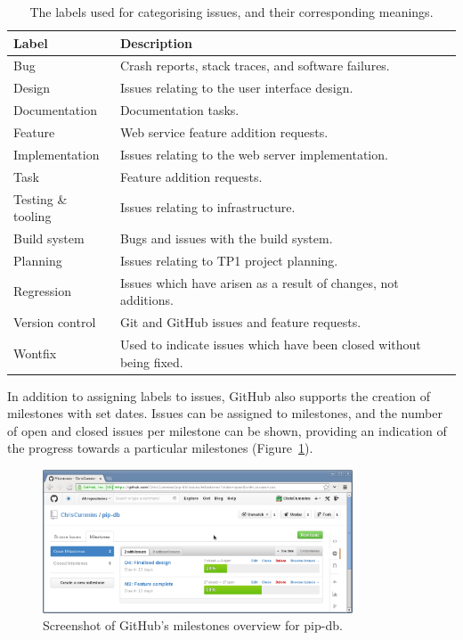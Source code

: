 \begin{table}[H]
\centering
\begin{tabular}{l l}
\textbf{Label} & \textbf{Description}\\
\hline
Bug & Crash reports, stack traces, and software failures.\\
Design & Issues relating to the user interface design.\\
Documentation & Documentation tasks.\\
Feature & Web service feature addition requests.\\
Implementation & Issues relating to the web server implementation.\\
Task & Feature addition requests.\\
Testing \& tooling & Issues relating to infrastructure.\\
Build system & Bugs and issues with the build system.\\
Planning & Issues relating to TP1 project planning.\\
Regression & Issues which have arisen as a result of changes, not additions.\\
Version control & Git and GitHub issues and feature requests.\\
Wontfix & Used to indicate issues which have been closed without being fixed.\\
\end{tabular}
\caption[Issue tracker labels]
        {The labels used for categorising issues, and their corresponding meanings.}
\label{tab:issue-labels}
\end{table}


In addition to assigning labels to issues, GitHub also supports the
creation of milestones with set dates. Issues can be assigned to
milestones, and the number of open and closed issues per milestone can
be shown, providing an indication of the progress towards a particular
milestones (Figure~\ref{fig:github-milestones}).


\begin{figure}[H]
\centering
    \includegraphics[width=0.82\textwidth]{assets/github-milestones}
\caption[GitHub project open milestones]
        {Screenshot of GitHub's milestones overview for pip-db.}
\label{fig:github-milestones}
\end{figure}


